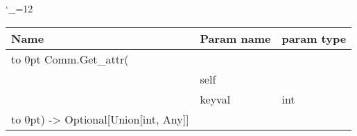 \begingroup \catcode`\_=12 \tt
\begin{tabular}{lll}
\toprule
\textrm{Name}&\textrm{Param name}&\textrm{param type}\\
\midrule
\hbox to 0pt {Comm.Get_attr(\hss}\\
& self\\
& keyval & int\\
\hbox to 0pt{) -> Optional[Union[int, Any]]\hss}\\
\bottomrule
\end{tabular}
\endgroup

